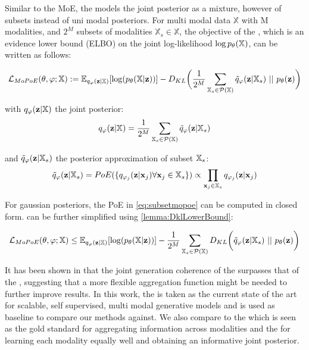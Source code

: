 Similar to the MoE, the  models the joint posterior as a mixture, however of subsets instead of uni modal posteriors.
For multi modal data $\mathbb{X}$ with M modalities, and $2^M$ subsets of modalities $\mathbb{X}_s \in \mathbb{X}$, the objective of the , which is an evidence lower bound (ELBO) on the joint log-likelihood $\log p_{\theta}(\mathbb{X})$, can be written as follows:

\begin{equation}
    \label{eq:mopoe}
    \mathcal{L}_{MoPoE}(\theta, \varphi; \mathbb{X}):= \mathbb{E}_{q_{\varphi}(\textbf{z}|\mathbb{X})}[\log (p_{\theta}(\mathbb{X}|\textbf{z}))] - D_{KL}\biggl( \frac{1}{2^M} \sum _{\mathbb{X}_s \in \mathcal{P}(\mathbb{X})} \tilde{q}_{\varphi}(\textbf{z}|\mathbb{X}_s)\ ||\ p_{\theta}(\textbf{z})\biggr)
\end{equation}

with $q_{\varphi}(\textbf{z}|\mathbb{X})$ the joint posterior:
\begin{equation}
    q_{\varphi}(\textbf{z}|\mathbb{X}) = \frac{1}{2^M} \sum _{\mathbb{X}_s \in \mathcal{P}(\mathbb{X})} \tilde{q}_{\varphi}(\textbf{z}|\mathbb{X}_s)
\end{equation}

and $\tilde{q}_{\varphi}(\textbf{z}|\mathbb{X}_s)$ the posterior approximation of subset $\mathbb{X}_s$:
\begin{equation}
    \label{eq:subsetmopoe}
    \tilde{q}_{\varphi}(\textbf{z}|\mathbb{X}_s)=PoE(\{q_{\varphi_j}(\textbf{z}|\textbf{x}_j) \forall \textbf{x}_j \in \mathbb{X}_s\}) \propto \prod _{\textbf{x}_j \in \mathbb{X}_s}q_{\varphi_j}(\textbf{z}|\textbf{x}_j)
\end{equation}

For gaussian posteriors, the PoE in \cref{eq:subsetmopoe} can be computed in closed form.
 can be further simplified using \cref{lemma:DklLowerBound}:

\begin{equation}
    \label{eq:mopoe_}
    \lmopoe \leq \mathbb{E}_{q_{\phi}(\textbf{z}|\mathbb{X})}[\log (p_{\theta}(\mathbb{X}|\textbf{z}))] - \frac{1}{2^M} \sum _{\mathbb{X}_s \in \mathcal{P}(\mathbb{X})} D_{KL}\biggl( \tilde{q}_{\phi}(\textbf{z}|\mathbb{X}_s)\ ||\ p_{\theta}(\textbf{z})\biggr)
\end{equation}


It has been shown in \citep{sutter_multimodal_2020} that the joint generation coherence of the  surpasses that of the , suggesting that a more flexible aggregation function might be needed to further improve results.
In this work, the  is taken as the current state of the art for scalable, self supervised, multi modal generative models and is used as baseline to compare our methods against.
We also compare to the  which is seen as the gold standard for aggregating information across modalities and the  for learning each modality equally well and obtaining an informative joint posterior.


